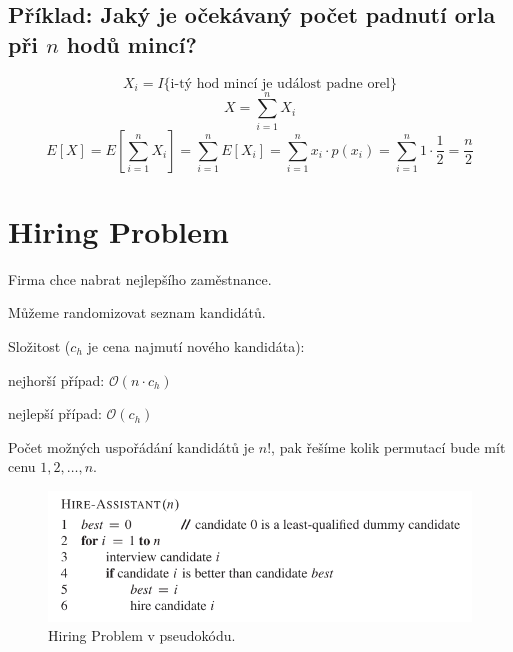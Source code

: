 \subsection{Příklad: Jaký je očekávaný počet padnutí orla při $n$ hodů mincí?}

$$ X_i = I\{ \text{i-tý hod mincí je událost padne orel} \}$$
$$ X = \sum_{i=1}^n X_i$$
$$ E[X] = E \left[ \sum_{i=1}^n X_i \right] = \sum_{i=1}^n E \left[ X_i \right] = \sum_{i=1}^n x_i \cdot p(x_i) = \sum_{i=1}^n 1 \cdot \frac{1}{2} = \frac{n}{2}$$


\section{Hiring Problem}

\begin{compactitem}
    \item Firma chce nabrat nejlepšího zaměstnance.

    \item Můžeme randomizovat seznam kandidátů.

    \item Složitost ($c_h$ je cena najmutí nového kandidáta): \begin{compactitem}
        \item nejhorší případ: $\mathcal{O}(n \cdot c_h)$
        \item nejlepší případ: $\mathcal{O}(c_h)$
    \end{compactitem}

    \item Počet možných uspořádání kandidátů je $n!$, pak řešíme kolik permutací bude mít cenu $1, 2, \dots, n$.

\end{compactitem}

\begin{figure}[H]
    \centering
    \includegraphics[width=0.8\linewidth]{hiring_problem.pdf}
    \caption{Hiring Problem v pseudokódu.}
\end{figure}

